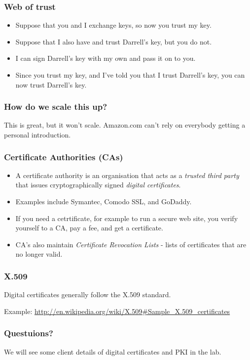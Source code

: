 \documentclass[10pt]{beamer}
\begin{document}
\begin{frame}
  \frametitle{Web of trust}

 \begin{itemize}
  \item Suppose that you and I exchange keys, so now you trust my key.
  \item Suppose that I also have and trust Darrell's key, but you do not.
  \item I can sign Darrell's key with my own and pass it on to you.
  \item Since you trust my key, and I've told you that I trust Darrell's key, you can now trust Darrell's key.
  \end{itemize}
\end{frame}


\begin{frame}
  \frametitle{How do we scale this up?}
  
  This is great, but it won't scale.  Amazon.com can't rely on everybody getting a personal introduction.
\end{frame}



\begin{frame}
  \frametitle{Certificate Authorities (CAs)}

 \begin{itemize}
  \item A certificate authority is an organisation that acts as a \emph{trusted third party} that issues cryptographically signed \emph{digital certificates}.
  \item Examples include Symantec, Comodo SSL, and GoDaddy.
  \item If you need a cetrtificate, for example to run a secure web site, you verify yourself to a CA, pay a fee, and get a certificate.
  \item CA's also maintain \emph{Certificate Revocation Lists} - lists of certificates that are no longer valid.
  \end{itemize}
\end{frame}



\begin{frame}[fragile]
  \frametitle{X.509}

  Digital certificates generally follow the X.509 standard.

  Example:  \url{http://en.wikipedia.org/wiki/X.509#Sample_X.509_certificates}
\end{frame}

\begin{frame}
  \frametitle{Questuions?}
  
   We will see some client details of digital certificates and PKI in the lab.

\end{frame}
\end{document}
